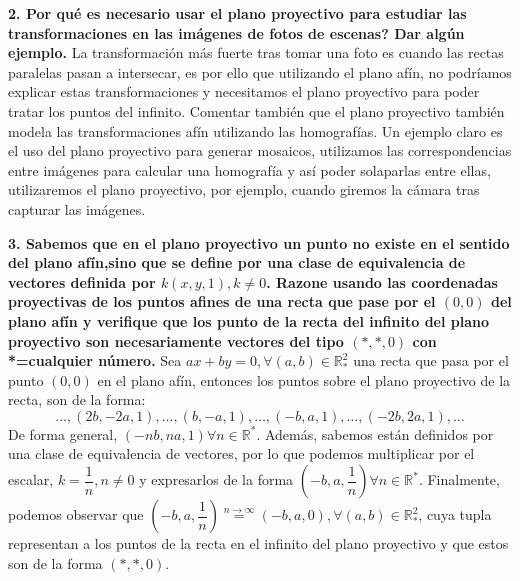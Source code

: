 \documentclass[12pt,a4paper]{article}
\begin{document}
	
	\newpage
	\textbf{2. Por qué es necesario usar el plano proyectivo para estudiar las transformaciones en las imágenes de fotos de escenas? Dar algún ejemplo.}
	\newline\newline
	La transformación más fuerte tras tomar una foto es cuando las rectas paralelas pasan a intersecar, es por ello que utilizando el plano afín, no podríamos explicar estas transformaciones y necesitamos el plano proyectivo para poder tratar los puntos del infinito. Comentar también que el plano proyectivo también modela las transformaciones afín utilizando las homografías.\newline
	Un ejemplo claro es el uso del plano proyectivo para generar mosaicos, utilizamos las correspondencias entre imágenes para calcular una homografía y así poder solaparlas entre ellas, utilizaremos el plano proyectivo, por ejemplo, cuando giremos la cámara tras capturar las imágenes.
	
	
	
	\newpage
	\textbf{3. Sabemos que en el plano proyectivo un punto no existe en el sentido del plano afín,sino que se define por una clase de equivalencia de vectores definida por ${k(x,y,1),k\ne 0}$. Razone usando las coordenadas proyectivas de los puntos afines de una recta que pase por el $(0,0)$ del plano afín y verifique que los punto de la recta del infinito del plano proyectivo son necesariamente vectores del tipo $(*,*,0)$ con *=cualquier número.}
	\newline\newline
	Sea $ax + by = 0, \forall (a,b)\in \mathbb{R}^2_*$ una recta que pasa por el punto $(0, 0)$ en el plano afín, entonces los puntos sobre el plano proyectivo de la recta, son de la forma:
		$$\dots, (2b, -2a, 1), \dots, (b, -a, 1), \dots, (-b, a, 1), \dots,(-2b, 2a, 1), \dots$$
	De forma general, $(-nb, na, 1)\forall n\in \mathbb{R}^*$. Además, sabemos están definidos por una clase de equivalencia de vectores, por lo que podemos multiplicar por el escalar, $k=\dfrac{1}{n}, n\neq 0$ y expresarlos de la forma $(-b, a, \dfrac{1}{n})\forall n\in \mathbb{R}^*$. Finalmente, podemos observar que $(-b, a, \dfrac{1}{n}) \overset{n\rightarrow \infty}{=} (-b, a, 0), \forall (a,b)\in \mathbb{R}^2_*$, cuya tupla representan a los puntos de la recta en el infinito del plano proyectivo y que estos son de la forma $(*,*,0)$.
	
\end{document}
